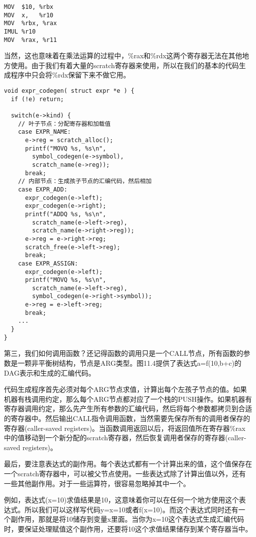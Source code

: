 \documentclass[cn,11pt,chinese]{elegantbook}
\begin{document}
\begin{verbatim}
MOV  $10, %rbx
MOV  x,   %r10
MOV  %rbx, %rax
IMUL %r10
MOV  %rax, %r11
\end{verbatim}

当然，这也意味着在乘法运算的过程中，\%rax和\%rdx这两个寄存器无法在其他地方使用。由于我们有着大量的scratch寄存器来使用，所以在我们的基本的代码生成程序中只会将\%rdx保留下来不做它用。

\begin{verbatim}
void expr_codegen( struct expr *e ) {
  if (!e) return;
  
  switch(e->kind) {
    // 叶子节点：分配寄存器和加载值
    case EXPR_NAME:
      e->reg = scratch_alloc();
      printf("MOVQ %s, %s\n",
        symbol_codegen(e->symbol),
        scratch_name(e->reg));
      break;
    // 内部节点：生成孩子节点的汇编代码，然后相加
    case EXPR_ADD:
      expr_codegen(e->left);
      expr_codegen(e->right);
      printf("ADDQ %s, %s\n",
        scratch_name(e->left->reg),
        scratch_name(e->right->reg));
      e->reg = e->right->reg;
      scratch_free(e->left->reg);
      break;
    case EXPR_ASSIGN:
      expr_codegen(e->left);
      printf("MOVQ %s, %s\n",
        scratch_name(e->left->reg),
        symbol_codegen(e->right->symbol));
      e->reg = e->left->reg;
      break;
    ...
  }
}
\end{verbatim}

第三，我们如何调用函数？还记得函数的调用只是一个CALL节点，所有函数的参数是一颗非平衡树结构，节点是ARG类型。图11.4提供了表达式a=f(10,b+c)的DAG表示和生成的汇编代码。

代码生成程序首先必须对每个ARG节点求值，计算出每个左孩子节点的值。如果机器有栈调用约定，那么每个ARG节点都对应了一个栈的PUSH操作。如果机器有寄存器调用约定，那么先产生所有参数的汇编代码，然后将每个参数都拷贝到合适的寄存器中。然后输出CALL指令调用函数，当然需要先保存所有的调用者保存的寄存器(caller-saved registers)。当函数调用返回以后，将返回值所在寄存器\%rax中的值移动到一个新分配的scratch寄存器，然后恢复调用者保存的寄存器(caller-saved registers)。

最后，要注意表达式的副作用。每个表达式都有一个计算出来的值，这个值保存在一个scratch寄存器中，可以被父节点使用。一些表达式除了计算出值以外，还有一些其他副作用。对于一些运算符，很容易忽略掉其中一个。

例如，表达式(x=10)求值结果是10，这意味着你可以在任何一个地方使用这个表达式。所以我们可以这样写代码y=x=10或者f(x=10)。而这个表达式同时还有一个副作用，那就是将10储存到变量x里面。当你为x=10这个表达式生成汇编代码时，要保证处理赋值这个副作用，还要将10这个求值结果储存到某个寄存器当中。
\end{document}
